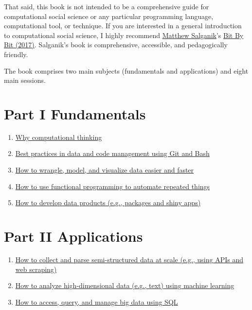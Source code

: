 \documentclass[
]{book}
\begin{document}
That said, this book is not intended to be a comprehensive guide for computational social science or any particular programming language, computational tool, or technique. If you are interested in a general introduction to computational social science, I highly recommend \href{http://www.princeton.edu/~mjs3/}{Matthew Salganik}'s \href{https://www.bitbybitbook.com/}{Bit By Bit (2017)}. Salganik's book is comprehensive, accessible, and pedagogically friendly.

The book comprises two main subjects (fundamentals and applications) and eight main sessions.

\hypertarget{part-i-fundamentals}{%
\section{Part I Fundamentals}\label{part-i-fundamentals}}

\begin{enumerate}
\def\labelenumi{\arabic{enumi}.}
\item
  \protect\hyperlink{motivation}{Why computational thinking}
\item
  \protect\hyperlink{git_bash}{Best practices in data and code management using Git and Bash}
\item
  \protect\hyperlink{tidy_data}{How to wrangle, model, and visualize data easier and faster}
\item
  \protect\hyperlink{functional_programming}{How to use functional programming to automate repeated things}
\item
  \protect\hyperlink{products}{How to develop data products (e.g., packages and shiny apps)}
\end{enumerate}

\hypertarget{part-ii-applications}{%
\section{Part II Applications}\label{part-ii-applications}}

\begin{enumerate}
\def\labelenumi{\arabic{enumi}.}
\setcounter{enumi}{5}
\item
  \protect\hyperlink{semi_structured_data}{How to collect and parse semi-structured data at scale (e.g., using APIs and web scraping)}
\item
  \protect\hyperlink{machine_learning}{How to analyze high-dimensional data (e.g., text) using machine learning}
\item
  \protect\hyperlink{big_data}{How to access, query, and manage big data using SQL}
\end{enumerate}
\end{document}
